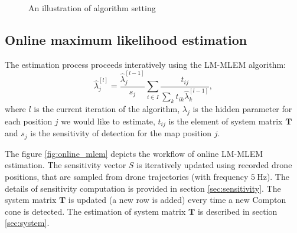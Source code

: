 \begin{figure}[!h]
  \centering

  \caption{An illustration of algorithm setting}
  \label{fig:discretization}
\end{figure}%

\subsection{Online maximum likelihood estimation}%
The estimation process proceeds interatively using the \ac{LM-MLEM} algorithm:
\begin{equation}
  \hat{\lambda}_{j}^{[l]} = \frac{\hat{\lambda}_{j}^{[l-1]}}{s_{j}} \sum_{i \in I} \frac{t_{ij}}{\sum_{k} t_{ik} \hat{\lambda}_{k}^{[l-1]}},
  \label{eq:MLEM}
\end{equation}
where $l$ is the current iteration of the algorithm, $\lambda_{j}$ is the hidden parameter for each position $j$ we would like to estimate, $t_{ij}$ is the element of system matrix $\mathbf{T}$ and $s_{j}$ is the sensitivity of detection for the map position $j$.

The figure \ref{fig:online_mlem} depicts the workflow of online \ac{LM-MLEM} estimation.
The sensitivity vector $S$ is iteratively updated using recorded drone positions, that are sampled from drone trajectories (with frequency $\SI{5}\hertz$).
The details of sensitivity computation is provided in section \ref{sec:sensitivity}.
The system matrix $\mathbf{T}$ is updated (a new row is added) every time a new Compton cone is detected.
The estimation of system matrix $\mathbf{T}$ is described in section \ref{sec:system}.

